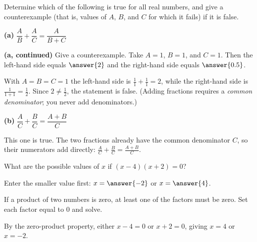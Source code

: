 \documentclass[12pt]{ximera}
\begin{document}
\begin{problem}
Determine which of the following is true for all real numbers, and give a
counterexample (that is, values of $A$, $B$, and $C$ for which it fails) if it is
false.

\begin{prompt}
\textbf{(a)} $\dfrac{A}{B} + \dfrac{A}{C} = \dfrac{A}{B+C}$

\begin{multipleChoice}
\end{multipleChoice}
\end{prompt}

\begin{prompt}
\textbf{(a, continued)} Give a counterexample. Take $A=1$, $B=1$, and $C=1$. Then the
left-hand side equals $\answer{2}$ and the right-hand side equals
$\answer{0.5}$.

\begin{feedback}
With $A=B=C=1$ the left-hand side is $\frac{1}{1}+\frac{1}{1}=2$, while the
right-hand side is $\frac{1}{1+1}=\frac{1}{2}$. Since $2\neq\frac12$, the statement
is false. (Adding fractions requires a \emph{common denominator}; you never add
denominators.)
\end{feedback}
\end{prompt}

\begin{prompt}
\textbf{(b)} $\dfrac{A}{C} + \dfrac{B}{C} = \dfrac{A+B}{C}$

\begin{multipleChoice}
\end{multipleChoice}

\begin{feedback}
This one is true. The two fractions already have the common denominator $C$, so
their numerators add directly:
$\frac{A}{C}+\frac{B}{C}=\frac{A+B}{C}$.
\end{feedback}
\end{prompt}
\end{problem}

\begin{problem}
What are the possible values of $x$ if $(x-4)(x+2)=0$?

Enter the smaller value first: $x = \answer{-2}$ or $x = \answer{4}$.

\begin{hint}
If a product of two numbers is zero, at least one of the factors must be zero.
Set each factor equal to $0$ and solve.
\end{hint}

\begin{feedback}
By the zero-product property, either $x-4=0$ or $x+2=0$, giving $x=4$ or $x=-2$.
\end{feedback}
\end{problem}
\end{document}
